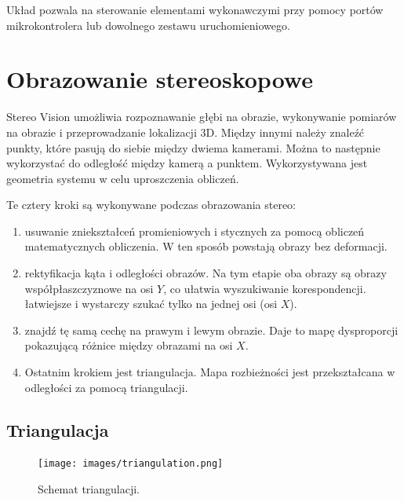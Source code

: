 \documentclass[magisterska]{pracadypl}
\begin{document}
Układ pozwala na sterowanie elementami wykonawczymi przy pomocy portów mikrokontrolera lub dowolnego zestawu uruchomieniowego.

\section{Obrazowanie stereoskopowe}

Stereo Vision umożliwia rozpoznawanie głębi na obrazie, wykonywanie pomiarów na obrazie
i przeprowadzanie lokalizacji 3D. Między innymi należy znaleźć punkty, które pasują do siebie między dwiema kamerami. Można to następnie wykorzystać do odległość między kamerą a punktem. Wykorzystywana jest geometria systemu w celu uproszczenia obliczeń.

Te cztery kroki są wykonywane podczas obrazowania stereo:

\begin{enumerate}
  \item usuwanie zniekształceń promieniowych i stycznych za pomocą obliczeń matematycznych
obliczenia. W ten sposób powstają obrazy bez deformacji.
  \item rektyfikacja kąta i odległości obrazów. Na tym etapie oba obrazy są
obrazy współpłaszczyznowe na osi $Y$, co ułatwia wyszukiwanie korespondencji.
łatwiejsze i wystarczy szukać tylko na jednej osi (osi $X$).
  \item znajdź tę samą cechę na prawym i lewym obrazie. Daje to mapę dysproporcji pokazującą różnice między obrazami na osi $X$.
  \item Ostatnim krokiem jest triangulacja. Mapa rozbieżności jest przekształcana w odległości za pomocą triangulacji.
\end{enumerate}

\subsection{Triangulacja}

\begin{figure}[H]  %
    \centering  %
    \texttt{[image: images/triangulation.png]}  %
    \captionsetup{font=footnotesize}
    \caption[Schemat triangulacji. Learning OpenCV 3, O'Reilly, Str. 705]{Schemat triangulacji.}
    \label{fig:rpi}  %
\end{figure}
\end{document}
